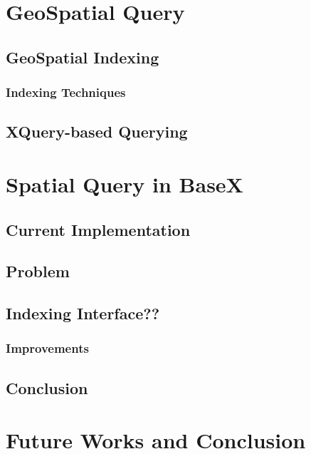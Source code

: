 \documentclass[a4paper,12pt]{article}
\begin{document}
\section{GeoSpatial Query}

\subsection{GeoSpatial Indexing}

\subsubsection{Indexing Techniques}

\subsection{XQuery-based Querying}

\newpage
\section{Spatial Query in BaseX}
\subsection{Current Implementation}
\subsection{Problem}
\subsection{Indexing Interface??}
\subsubsection{Improvements}
\subsection{Conclusion}

\newpage
\section{Future Works and Conclusion}

\newpage
\begin{thebibliography}{9}


\end{thebibliography}
\end{document}
